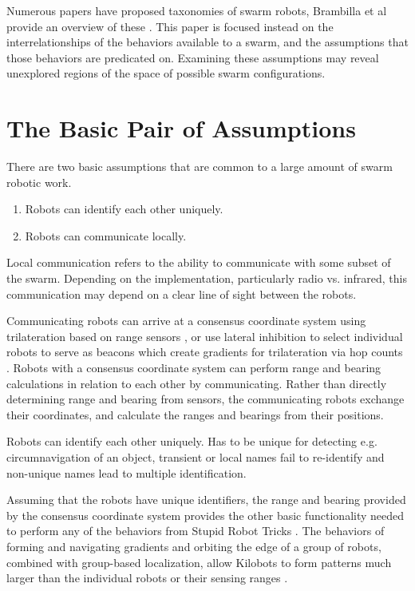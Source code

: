 \documentclass[]{article}
\begin{document}
Numerous papers have proposed taxonomies of swarm robots, Brambilla et al provide an overview of these \cite{brambilla2013swarm}. 
This paper is focused instead on the interrelationships of the behaviors available to a swarm, and the assumptions that those behaviors are predicated on. 
Examining these assumptions may reveal unexplored regions of the space of possible swarm configurations. 



\section{The Basic Pair of Assumptions}

There are two basic assumptions that are common to a large amount of swarm robotic work. 
\begin{enumerate}
\item Robots can identify each other uniquely.
\item Robots can communicate locally. 
\end{enumerate}

Local communication refers to the ability to communicate with some subset of the swarm.
Depending on the implementation, particularly radio vs. infrared, this communication may depend on a clear line of sight between the robots. 

Communicating robots can arrive at a consensus coordinate system using trilateration  based on range sensors \cite{cheng2005robust}, or use lateral inhibition to select individual robots to serve as beacons which create gradients for trilateration via hop counts \cite{nagpal1999organizing}.
Robots with a consensus coordinate system can perform range and bearing calculations in relation to each other by communicating.
Rather than directly determining range and bearing from sensors, the communicating robots exchange their coordinates, and calculate the ranges and bearings from their positions. 

Robots can identify each other uniquely. Has to be unique for detecting e.g. circumnavigation of an object, transient or local names fail to re-identify and non-unique names lead to multiple identification.

Assuming that the robots have unique identifiers, the range and bearing provided by the consensus coordinate system provides the other basic functionality needed to perform any of the behaviors from Stupid Robot Tricks \cite{mclurkin2004stupid}.
The behaviors of forming and navigating gradients and orbiting the edge of a group of robots, combined with group-based localization, allow Kilobots to form patterns much larger than the individual robots or their sensing ranges \cite{Rubenstein795}.
\end{document}
